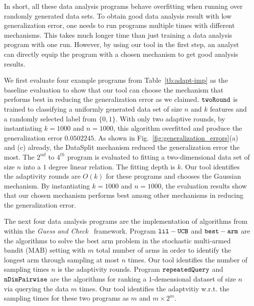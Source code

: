 In short, all these data analysis programs behave overfitting when running over randomly generated data sets. 
To obtain good data analysis result with low generalization error,
one needs to run programs multiple times with different mechanisms.
This takes much longer time than just training a data analysis program with one run.
However, by using our tool in the first step, an analyst can directly equip the program with a chosen mechanism to get good
analysis results.


We first evaluate four example programs from Table~\ref{tb:adapt-imp} as the baseline evaluation to show that our tool can choose the mechanism that performs best in reducing the generalization error as we claimed.
$\mathtt{twoRound}$ is trained to classifying a uniformly generated data set of size $n$ and $k$ features and a randomly selected label from $\{0, 1\}$. 
With only two adaptive rounds, by instantiating $k = 1000$ and $n = 1000$, this algorithm overfitted and produce the generalization error 
$0.0502245$. As shown in Fig.~\ref{fig:generalization_errors}(a) and (c) already,
the DataSplit mechanism reduced the generalization error the most.
The $2^{nd}$ to $4^{th}$ program is evaluated to fitting a two-dimensional data set of size $n$ into a $1$ degree linear relation.
The fitting depth is $k$.
Our tool identifies the adaptivity rounds are $O(k)$ for these programs and chooses the Gaussian mechanism.
By instantiating $k = 1000$ and $n = 1000$, the evaluation results show that our chosen mechanism performs best among other mechanisms in reducing the generalization error.

The next four data analysis programs are the implementation of algorithms from~\cite{Jamieson2015TheAO} within the \emph{Guess and Check}~\cite{RogersRSSTW20} framework.
Program $\mathtt{lil-UCB}$ and $\mathtt{best-arm}$ are the algorithms to solve the best arm problem in the stochastic multi-armed bandit (MAB) setting
with $m$ total number of arms in order to identify the longest arm through sampling at most $n$ times.
Our tool identifies the number of sampling times $n$ is the adaptivity rounds.
Program $\mathtt{repeatedQuery}$ and $\mathtt{nDimPairwise}$ are the algorithms for ranking
a $1$-demensional dataset of size $n$ via querying the data $m$ times.
Our tool identifies the adaptvitiy w.r.t. the sampling times for these two programs as $m$ and $m \times 2^m$.

